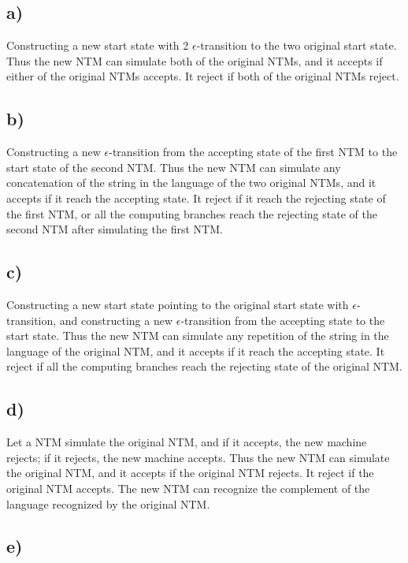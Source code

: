 \documentclass[a4paper, UTF-8]{article}
\theoremstyle{plain}
\begin{document}
\subsection{a)} 

Constructing a new start state with 2 $\epsilon$-transition to the two original start state. Thus the new NTM can simulate both of the original NTMs, and it accepts if either of the original NTMs accepts. It reject if both of the original NTMs reject.

\subsection{b)} 

Constructing a new $\epsilon$-transition from the accepting state of the first NTM to the start state of the second NTM. Thus the new NTM can simulate any concatenation of the string in the language of the two original NTMs, and it accepts if it reach the accepting state. It reject if it reach the rejecting state of the first NTM, or all the computing branches reach the rejecting state of the second NTM after simulating the first NTM.

\subsection{c)} 

Constructing a new start state pointing to the original start state with $\epsilon$-transition, and constructing a new $\epsilon$-transition from the accepting state to the start state. Thus the new NTM can simulate any repetition of the string in the language of the original NTM, and it accepts if it reach the accepting state. It reject if all the computing branches reach the rejecting state of the original NTM.

\subsection{d)} 

Let a NTM simulate the original NTM, and if it accepts, the new machine rejects; if it rejects, the new machine accepts. Thus the new NTM can simulate the original NTM, and it accepts if the original NTM rejects. It reject if the original NTM accepts. The new NTM can recognize the complement of the language recognized by the original NTM.

\subsection{e)} 
\end{document}

